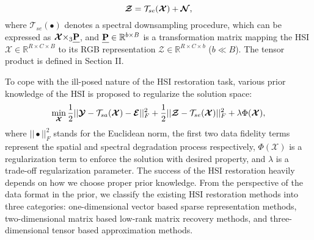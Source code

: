 \documentclass[twocolumn]{svjour3}          %
\begin{document}
  \begin{equation}\label{eq:Spectral_Degradation}
  \setlength{\abovedisplayskip}{2pt}
  \setlength{\belowdisplayskip}{2pt}
  {\boldsymbol{\mathcal{Z}}} = {\mathcal{T}_{se}}({\boldsymbol{\mathcal{X}}}) + {\boldsymbol{\mathcal{N}}},
  \end{equation}
  where ${\mathcal{T}_{se}}( \bullet )$ denotes a spectral downsampling procedure, which can be expressed as ${\boldsymbol{\mathcal{X}}}{ \times _3}\textbf{\emph{P}}$, and $\textbf{\emph{P}} \in {\mathbb{R}^{b \times B}}$ is a transformation matrix mapping the HSI ${\boldsymbol{\mathcal{X}}} \in {\mathbb{R}^{R \times C \times B}}$ to its RGB representation ${\boldsymbol{\mathcal{Z}}} \in {\mathbb{R}^{R \times C \times b}}$ ($b \ll B$). The tensor product is defined in Section II.

  To cope with the ill-posed nature of the HSI restoration task, various prior knowledge of the HSI is proposed to regularize the solution space:
  \begin{equation}\label{eq:Regularization Framework}
  \setlength{\abovedisplayskip}{2pt}
  \setlength{\belowdisplayskip}{2pt}
  \mathop {\min }\limits_{\boldsymbol{\mathcal{X}}} \frac{1}{2}||{\boldsymbol{\mathcal{Y}}} - {\mathcal{T}_{sa}}({\boldsymbol{\mathcal{X}}}) - {\boldsymbol{\mathcal{E}}}||_F^2 + \frac{1}{2}||{\boldsymbol{\mathcal{Z}}} - {\mathcal{T}_{se}}({\boldsymbol{\mathcal{X}}})||_F^2 + \lambda \Phi ({\boldsymbol{\mathcal{X}}}),
  \end{equation}
  where $|| \bullet ||_F^2$ stands for the Euclidean norm, the first two data fidelity terms represent the spatial and spectral degradation process respectively, $\Phi ({\boldsymbol{\mathcal{X}}})$ is a regularization term to enforce the solution with desired property, and $\lambda$ is a trade-off regularization parameter. The success of the HSI restoration heavily depends on how we choose proper prior knowledge. From the perspective of the data format in the prior, we classify the existing HSI restoration methods into three categories: one-dimensional vector based sparse representation methods, two-dimensional matrix based low-rank matrix recovery methods, and three-dimensional tensor based approximation methods.
\end{document}
